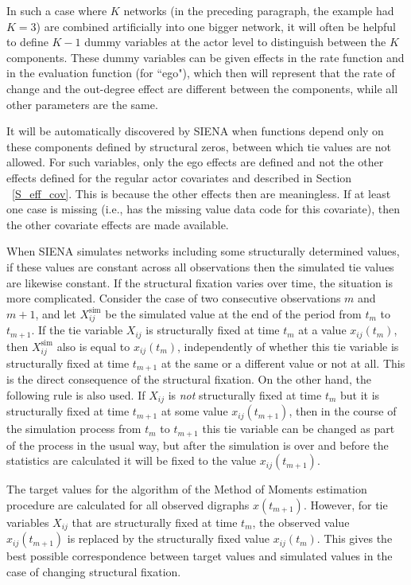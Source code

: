 \documentclass[a4paper,fleqn]{article}
\newcommand{\+}{\, + \,}
\newcommand{\SI}{{\sf SIENA }}
\begin{document}
{In such a case where $K$ networks (in the preceding paragraph, the
example had $K = 3$) are combined artificially into one bigger
network, it will often be helpful to define $K-1$ dummy variables
at the actor level to distinguish between the $K$ components.
These dummy variables can be given effects in the rate function
and in the evaluation function (for ``ego"), which then will
represent that the rate of change and the out-degree effect are
different between the components, while all other parameters are
the same.

It will be automatically discovered by \SI when functions
depend only on these components defined by structural zeros,
between which tie values are not allowed.
For such variables, only the ego effects are defined
and not the other effects defined for the regular
actor covariates and described in Section ~\ref{S_eff_cov}.
This is because the other effects then are meaningless.
If at least one case is missing (i.e., has the missing value data code
for this covariate),
then the other covariate effects are made available.

When \SI simulates networks including some structurally determined values,
if these values are constant across all observations then
the simulated tie values are likewise constant.
If the structural fixation varies over time, the situation
is more complicated.
Consider the case of two consecutive observations
$m$ and $m+1$,
and let $X^{\text{sim}}_{ij}$ be the simulated value
at the end of the period from $t_m$ to $t_{m+1}$.
If the tie variable $X_{ij}$ is structurally fixed at time $t_m$
at a value $x_{ij}(t_m)$,
then $X^{\text{sim}}_{ij}$ also is equal to $x_{ij}(t_m)$,
independently of whether this tie variable is structurally fixed
at time $t_{m+1}$ at the same or a different value or not at all.
This is the direct consequence of the structural fixation.
On the other hand, the following rule is also used.
If $X_{ij}$ is \emph{not} structurally fixed at time $t_m$
but it is structurally fixed at time $t_{m+1}$ at some value $x_{ij}(t_{m+1})$,
then in the course of the simulation process from  $t_m$ to $t_{m+1}$
this tie variable can be changed as part of the process in the usual way,
but after the simulation is over and before the statistics are calculated it will be fixed
to the value $x_{ij}(t_{m+1})$.

The target values for the algorithm of the Method of Moments estimation
procedure are calculated for all observed digraphs $x(t_{m+1})$.
However, for tie variables $X_{ij}$ that are
structurally fixed at time $t_m$, the observed value  $x_{ij}(t_{m+1})$
is replaced by the structurally fixed value  $x_{ij}(t_{m})$.
This gives the best possible correspondence between target values
and simulated values in the case of changing structural fixation.

}
\end{document}
